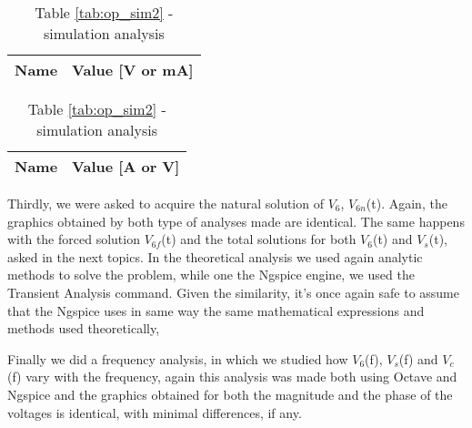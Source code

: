 \begin{table}[H]
    \caption{Operating Point for $t=0$ comparison}
    \begin{subtable}{.5\linewidth}
    \centering
      \caption{Table \ref{tab:nodal2} - theoretical analysis}
      \begin{tabular}{|l|r|}
       \hline    
       {\bf Name} & {\bf Value [V or mA]} \\ \hline
       
      \end{tabular}
      \label{tab:nodal2comp}
    \end{subtable}%
    \begin{subtable}{.5\linewidth}
    \centering
      \caption{Table \ref{tab:op_sim2} - simulation analysis}
      \begin{tabular}{|l|r|}
       \hline    
      {\bf Name} & {\bf Value [A or V]} \\ \hline
      
      \end{tabular}
      \label{tab:op_sim2comp}
    \end{subtable} 
    \label{tab:comp2}
\end{table}

\par
Thirdly, we were asked to acquire the natural solution of $V_6$, $V_{6n}$(t). Again, the graphics obtained by both type of analyses made are identical. The same happens with the forced solution $V_{6f}$(t) and the total solutions for both $V_6$(t) and $V_s$(t), asked in the next topics. In the theoretical analysis we used again analytic methods to solve the problem, while one the Ngspice engine, we used the Transient Analysis command. Given the similarity, it's once again safe to assume that the Ngspice uses in same way the same mathematical expressions and methods used theoretically,
\par
Finally we did a frequency analysis, in which we studied how $V_6$(f), $V_s$(f) and $V_c$(f) vary with the frequency, again this analysis was made both using Octave and Ngspice and the graphics obtained for both the magnitude and the phase of the voltages is identical, with minimal differences, if any.
\par





\newpage
